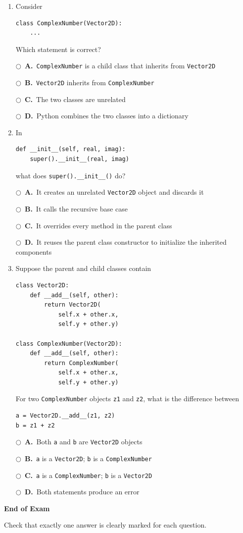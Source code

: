 \documentclass[11pt]{article}
\newcommand{\choice}[2]{%
    \par\noindent
    \(\bigcirc\)\ \textbf{#1.}\ #2
}
\begin{document}
\begin{enumerate}
\item Consider

\begin{verbatim}
class ComplexNumber(Vector2D):
    ...
\end{verbatim}

Which statement is correct?

\choice{A}{\texttt{ComplexNumber} is a child class that inherits from \texttt{Vector2D}}
\choice{B}{\texttt{Vector2D} inherits from \texttt{ComplexNumber}}
\choice{C}{The two classes are unrelated}
\choice{D}{Python combines the two classes into a dictionary}

\item In

\begin{verbatim}
def __init__(self, real, imag):
    super().__init__(real, imag)
\end{verbatim}

what does \texttt{super().\_\_init\_\_()} do?

\choice{A}{It creates an unrelated \texttt{Vector2D} object and discards it}
\choice{B}{It calls the recursive base case}
\choice{C}{It overrides every method in the parent class}
\choice{D}{It reuses the parent class constructor to initialize the inherited components}

\item Suppose the parent and child classes contain

\begin{verbatim}
class Vector2D:
    def __add__(self, other):
        return Vector2D(
            self.x + other.x,
            self.y + other.y)

class ComplexNumber(Vector2D):
    def __add__(self, other):
        return ComplexNumber(
            self.x + other.x,
            self.y + other.y)
\end{verbatim}

For two \texttt{ComplexNumber} objects \texttt{z1} and \texttt{z2}, what is the difference between

\begin{verbatim}
a = Vector2D.__add__(z1, z2)
b = z1 + z2
\end{verbatim}

\choice{A}{Both \texttt{a} and \texttt{b} are \texttt{Vector2D} objects}
\choice{B}{\texttt{a} is a \texttt{Vector2D}; \texttt{b} is a \texttt{ComplexNumber}}
\choice{C}{\texttt{a} is a \texttt{ComplexNumber}; \texttt{b} is a \texttt{Vector2D}}
\choice{D}{Both statements produce an error}

\end{enumerate}

\vfill

\begin{center}
\textbf{End of Exam}

Check that exactly one answer is clearly marked for each question.
\end{center}
\end{document}
